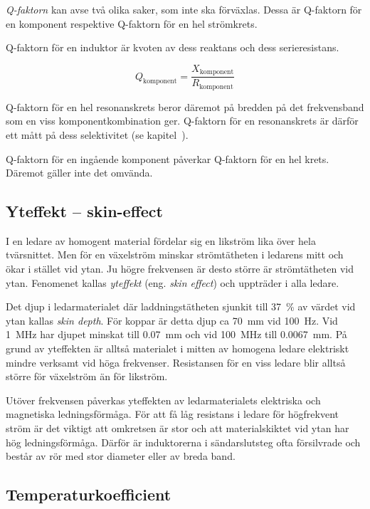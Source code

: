 \emph{Q-faktorn} kan avse två olika saker, som inte ska förväxlas.
Dessa är Q-faktorn för en komponent respektive Q-faktorn för en hel strömkrets.

Q-faktorn för en induktor är kvoten av dess reaktans och dess serieresistans.

\[Q_{\text{komponent}} = \dfrac{X_{\text{komponent}}}{R_{\text{komponent}}}\]

Q-faktorn för en hel resonanskrets beror däremot på bredden på det
frekvensband som en viss komponentkombination ger.
Q-faktorn för en resonanskrets är därför ett mått på dess
selektivitet (se kapitel~).

Q-faktorn för en ingående komponent påverkar Q-faktorn för en hel krets.
Däremot gäller inte det omvända.

\subsection{Yteffekt -- skin-effect}

I en ledare av homogent material fördelar sig en likström lika över hela
tvärsnittet.
Men för en växelström minskar strömtätheten i ledarens mitt och ökar i stället
vid ytan.
Ju högre frekvensen är desto större är strömtätheten vid ytan.
Fenomenet kallas \emph{yteffekt} (eng. \emph{skin effect}) och uppträder i alla
ledare.

Det djup i ledarmaterialet där laddningstätheten sjunkit till \qty{37}{\percent}
av värdet vid ytan kallas \emph{skin depth}.
För koppar är detta djup ca \qty{70}{\milli\metre} vid \qty{100}{\hertz}.
Vid \qty{1}{\mega\hertz} har djupet minskat till \qty{0,07}{\milli\metre} och
vid \qty{100}{\mega\hertz} till \qty{0,0067}{\milli\metre}.
På grund av yteffekten är alltså materialet i mitten av homogena ledare
elektriskt mindre verksamt vid höga frekvenser.
Resistansen för en viss ledare blir alltså större för växelström än för likström.

Utöver frekvensen påverkas yteffekten av ledarmaterialets elektriska och
magnetiska ledningsförmåga.
För att få låg resistans i ledare för högfrekvent ström är det viktigt att
omkretsen är stor och att materialskiktet vid ytan har hög ledningsförmåga.
Därför är induktorerna i sändarslutsteg ofta försilvrade och består av rör med
stor diameter eller av breda band.

\subsection{Temperaturkoefficient}

